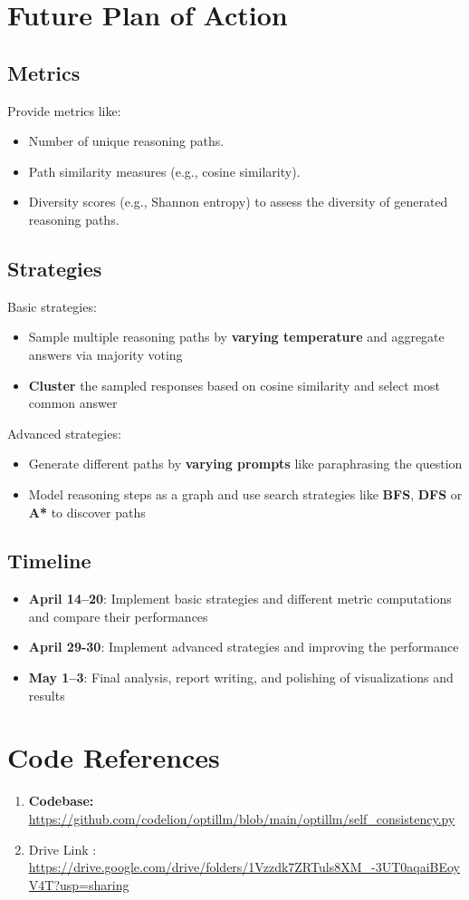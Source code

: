 \documentclass[24pt]{article}
\begin{document}

\section{Future Plan of Action}

\subsection{Metrics}
Provide metrics like:
\begin{itemize}
    \item Number of unique reasoning paths.
    \item Path similarity measures (e.g., cosine similarity).
    \item Diversity scores (e.g., Shannon entropy) to assess the diversity of generated reasoning paths.
\end{itemize}


\subsection{Strategies}
Basic strategies:
\begin{itemize}
    \item Sample multiple reasoning paths by \textbf{varying temperature} and aggregate answers via majority voting
    \item \textbf{Cluster} the sampled responses based on cosine similarity and select most common answer
\end{itemize}
Advanced strategies:
\begin{itemize}
    \item Generate different paths by \textbf{varying prompts} like paraphrasing the question
    \item Model reasoning steps as a graph and use search strategies like \textbf{BFS}, \textbf{DFS} or \textbf{A*} to discover paths
\end{itemize}

\subsection{Timeline}
\begin{itemize}
    \item \textbf{April 14–20}: Implement basic strategies and different metric computations and compare their performances
    \item \textbf{April 29-30}: Implement advanced strategies and improving the performance
    \item \textbf{May 1–3}: Final analysis, report writing, and polishing of visualizations and results
\end{itemize}

\section{Code References}
\begin{enumerate}
    \item \textbf{Codebase:} \url{https://github.com/codelion/optillm/blob/main/optillm/self_consistency.py}
    \item Drive Link : \url{https://drive.google.com/drive/folders/1Vzzdk7ZRTuls8XM_-3UT0aqaiBEoyV4T?usp=sharing}
\end{enumerate}
\end{document}
